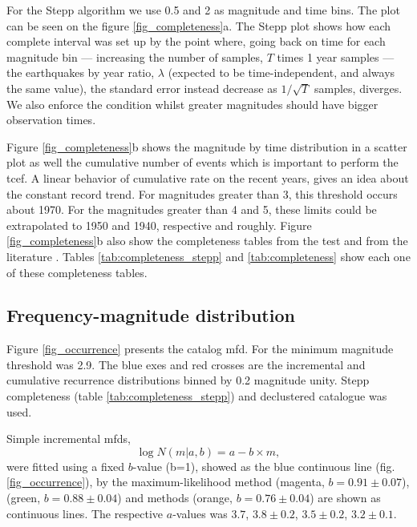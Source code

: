 \documentclass[draft, grl]{agutex}
\begin{document}
\begin{article}
For the Stepp algorithm we use 0.5 and 2 as magnitude and time bins. The plot can be seen on the figure \ref{fig_completeness}a. The Stepp plot shows how each complete interval was set up by the point where, going back on time for each magnitude bin  --- increasing the number of samples, $T$ times 1 year samples --- the earthquakes by year ratio, $\lambda$ (expected to be time-independent, and always the same value), the standard error instead decrease as $1/\sqrt{T}$ samples, diverges. We also enforce the condition whilst greater magnitudes should have bigger observation times.

Figure \ref{fig_completeness}b shows the magnitude by time distribution in a scatter plot as well the cumulative number of events which is important to perform the \gls{tcef}. A linear behavior of cumulative rate on the recent years, gives an idea about the constant record trend. For magnitudes greater than 3, this threshold occurs about 1970. For the magnitudes greater than 4 and 5, these limits could be extrapolated to 1950 and 1940, respective and roughly. Figure \ref{fig_completeness}b also show the completeness tables from the \citet{stepp_1972} test and from the literature \citep{assumpcao_et_al_2014}. Tables \ref{tab:completeness_stepp} and \ref{tab:completeness} show each one of these completeness tables.


\subsection{Frequency-magnitude distribution}

Figure \ref{fig_occurrence} presents the catalog \gls{mfd}. For the minimum magnitude threshold was 2.9. The blue exes and red crosses are the incremental and cumulative recurrence distributions binned by 0.2 magnitude unity. Stepp completeness (table \ref{tab:completeness_stepp}) and \citet{bsb_2014} declustered catalogue was used. 

Simple \citet{gutenberg_richter_1944} incremental \glspl{mfd},
\begin{equation}
\log{N}(m|a,b) = a - b \times m,
\end{equation}
were fitted using a fixed $b$-value (b=1), showed as the blue continuous line (fig. \ref{fig_occurrence}), by the maximum-likelihood method (magenta, $b=0.91\pm0.07$), \citet{weichert_1980} (green, $b=0.88\pm0.04$) and \citet{kijko_2012} methods (orange, $b=0.76\pm0.04$) are shown as continuous lines. The respective $a$-values was $3.7$, $3.8\pm0.2$, $3.5\pm0.2$, $3.2\pm0.1$.


\end{article}
\end{document}
